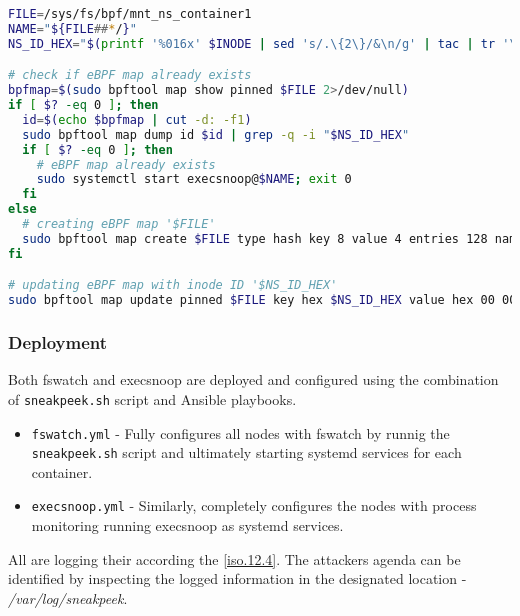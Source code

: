 \begin{lstlisting}[language=bash, style=custom, caption={Setup of BPF map for sharing the mount namespave with execsnoop instance. INODE variable is retrieved using the command sequence specified in \autoref{listing:sneakpeek:mntns}}, label=listing:bpftool:snippet]
FILE=/sys/fs/bpf/mnt_ns_container1
NAME="${FILE##*/}"
NS_ID_HEX="$(printf '%016x' $INODE | sed 's/.\{2\}/&\n/g' | tac | tr '\n' ' ')"

# check if eBPF map already exists
bpfmap=$(sudo bpftool map show pinned $FILE 2>/dev/null)
if [ $? -eq 0 ]; then
  id=$(echo $bpfmap | cut -d: -f1)
  sudo bpftool map dump id $id | grep -q -i "$NS_ID_HEX"
  if [ $? -eq 0 ]; then
    # eBPF map already exists
    sudo systemctl start execsnoop@$NAME; exit 0
  fi
else
  # creating eBPF map '$FILE'
  sudo bpftool map create $FILE type hash key 8 value 4 entries 128 name $NAME flags 0
fi

# updating eBPF map with inode ID '$NS_ID_HEX'
sudo bpftool map update pinned $FILE key hex $NS_ID_HEX value hex 00 00 00 00 any
\end{lstlisting}

\subsubsection*{Deployment}
Both fswatch and execsnoop are deployed and configured using the combination of \texttt{sneakpeek.sh} script and Ansible playbooks.
\begin{itemize}
	\item \texttt{fswatch.yml} - Fully configures all nodes with fswatch by runnig the \texttt{sneakpeek.sh} script and ultimately starting systemd services for each container.
	\item \texttt{execsnoop.yml} - Similarly, completely configures the nodes with process monitoring running execsnoop as systemd services.
\end{itemize}
All are logging their according the \ref{iso.12.4}. The attackers agenda can be identified by inspecting the logged information in the designated location - \textit{/var/log/sneakpeek}. 



